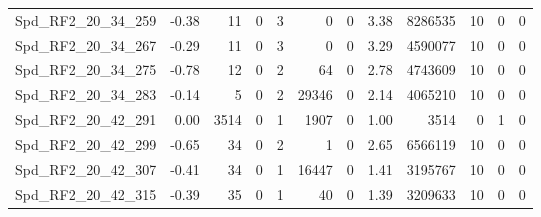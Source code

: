 \begin{longtable}[c]{@{}lrrrrrrrrrrr@{}}
Spd\_RF2\_20\_34\_259         & -0.38                  & 11                      & 0                       & 3                      & 0                       & 0                       & 3.38                    & 8286535                  & 10                       & 0                        & 0                        \\
Spd\_RF2\_20\_34\_267         & -0.29                  & 11                      & 0                       & 3                      & 0                       & 0                       & 3.29                    & 4590077                  & 10                       & 0                        & 0                        \\
Spd\_RF2\_20\_34\_275         & -0.78                  & 12                      & 0                       & 2                      & 64                      & 0                       & 2.78                    & 4743609                  & 10                       & 0                        & 0                        \\
Spd\_RF2\_20\_34\_283         & -0.14                  & 5                       & 0                       & 2                      & 29346                   & 0                       & 2.14                    & 4065210                  & 10                       & 0                        & 0                        \\
Spd\_RF2\_20\_42\_291         & 0.00                   & 3514                    & 0                       & 1                      & 1907                    & 0                       & 1.00                    & 3514                     & 0                        & 1                        & 0                        \\
Spd\_RF2\_20\_42\_299         & -0.65                  & 34                      & 0                       & 2                      & 1                       & 0                       & 2.65                    & 6566119                  & 10                       & 0                        & 0                        \\
Spd\_RF2\_20\_42\_307         & -0.41                  & 34                      & 0                       & 1                      & 16447                   & 0                       & 1.41                    & 3195767                  & 10                       & 0                        & 0                        \\
Spd\_RF2\_20\_42\_315         & -0.39                  & 35                      & 0                       & 1                      & 40                      & 0                       & 1.39                    & 3209633                  & 10                       & 0                        & 0                        \\

\end{longtable}
